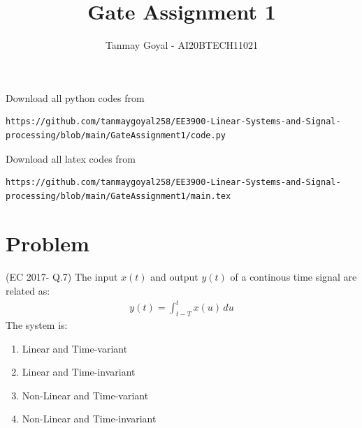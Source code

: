 \documentclass[journal,12pt,twocolumn]{IEEEtran}
\begin{document}
\def\putbox#1#2#3{\makebox[0in][l]{\makebox[#1][l]{}\raisebox{\baselineskip}[0in][0in]{\raisebox{#2}[0in][0in]{#3}}}}
     \def\rightbox#1{\makebox[0in][r]{#1}}
     \def\centbox#1{\makebox[0in]{#1}}
     \def\topbox#1{\raisebox{-\baselineskip}[0in][0in]{#1}}
     \def\midbox#1{\raisebox{-0.5\baselineskip}[0in][0in]{#1}}
\vspace{3cm}
\title{Gate Assignment 1}
\author{Tanmay Goyal - AI20BTECH11021}
\maketitle
\newpage
\bigskip
\renewcommand{\thefigure}{\theenumi}
\renewcommand{\thetable}{\theenumi}
Download all python codes from 
\begin{lstlisting}
https://github.com/tanmaygoyal258/EE3900-Linear-Systems-and-Signal-processing/blob/main/GateAssignment1/code.py
\end{lstlisting}
Download all latex codes from 
\begin{lstlisting}
https://github.com/tanmaygoyal258/EE3900-Linear-Systems-and-Signal-processing/blob/main/GateAssignment1/main.tex
\end{lstlisting}
\section{Problem}
(EC 2017- Q.7) The input $x(t)$ and output $y(t)$ of a continous time signal are related as:
\begin{align}
    y(t) = \int_{t-T}^tx(u)\,du
\end{align}
The system is:
\begin{enumerate}
    \item Linear and Time-variant
    \item Linear and Time-invariant
    \item Non-Linear and Time-variant
    \item Non-Linear and Time-invariant
\end{enumerate}
\end{document}
